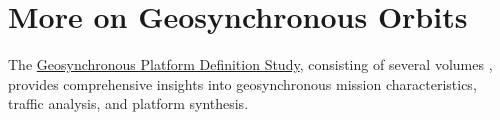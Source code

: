 % 

\section{More on Geosynchronous Orbits}
The \href{https://ntrs.nasa.gov/search?q=Geosynchronous\%20platform\%20definition\%20study&page=\%7B\%22from\%22:0,\%22size\%22:25\%7D}{Geosynchronous Platform Definition Study}, consisting of several volumes 
\cite{
Myers1973_ExecSummary,
Myers1973_StudySummary,
Myers1973,
Myers1973_TrafficBaseline,
Myers1973_PlatformSynthesis,
Myers1973_TransportationRequirements,
Myers1973_ProgramEval,
Myers1973_TransportationRequirements}, provides comprehensive insights into geosynchronous mission characteristics, traffic analysis, and platform synthesis.

\endinput  %
[Executive Summary, Vols. I, II, III, IVa, IVb,V,VI]
